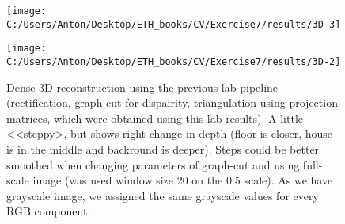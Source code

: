 \documentclass{report}
\begin{document}
\begin{figure}[h]
\begin{center}
	\begin{minipage}[h]{0.6\linewidth}
		\texttt{[image: C:/Users/Anton/Desktop/ETH\_books/CV/Exercise7/results/3D-3]}		
	\end{minipage}
\hfill
\begin{minipage}[h]{0.37\linewidth}
	\texttt{[image: C:/Users/Anton/Desktop/ETH\_books/CV/Exercise7/results/3D-2]}
\end{minipage}
\caption{Dense 3D-reconstruction using the previous lab pipeline (rectification, graph-cut for dispairity, triangulation using projection matrices, which were obtained using this lab results). A little <<steppy>, but shows right change in depth (floor is closer, house is in the middle and backround is deeper). Steps could be better smoothed when changing parameters of graph-cut and using full-scale image (was used window size 20 on the 0.5 scale). As we have grayscale image, we assigned the same grayscale values for every RGB component.}
\end{center}
\end{figure}
\newpage
\end{document}
